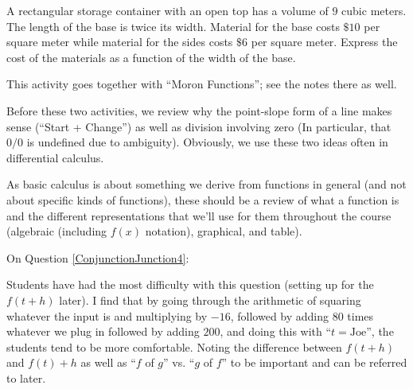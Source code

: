 \documentclass[nooutcomes]{ximera}
\begin{document}
\begin{question} 
A rectangular storage container with an open top has a volume of $9$ cubic meters.  The length of the base is twice its width.  Material for the base costs $\$10$ per square meter while material for the sides costs $\$6$ per square meter.  Express the cost of the materials as a function of the width of the base.
\end{question}

\newpage
\begin{instructorNotes}
This activity goes together with ``Moron Functions''; see the notes there as well.

Before these two activities, we review why the point-slope form of a line makes sense (``Start + Change'') as well as division involving zero (In particular, that $0/0$ is undefined due to ambiguity).  Obviously, we use these two ideas often in differential calculus.

As basic calculus is about something we derive from functions in general (and not about specific kinds of functions), these should be a review of what a function is and the different representations that we'll use for them throughout the course (algebraic (including $f(x)$ notation), graphical, and table).  


On Question \ref{ConjunctionJunction4}:

Students have had the most difficulty with this question (setting up for the $f(t + h)$ later).  I find that by going through the arithmetic of squaring whatever the input is and multiplying by $-16$, followed by adding $80$ times whatever we plug in followed by adding $200$, and doing this with ``$t = \text{Joe}$'', the students tend to be more comfortable.  Noting the difference between $f(t + h)$ and $f(t) + h$ as well as ``$f$ of $g$'' vs. ``$g$ of $f$'' to be important and can be referred to later.




\end{instructorNotes}
\end{document}
